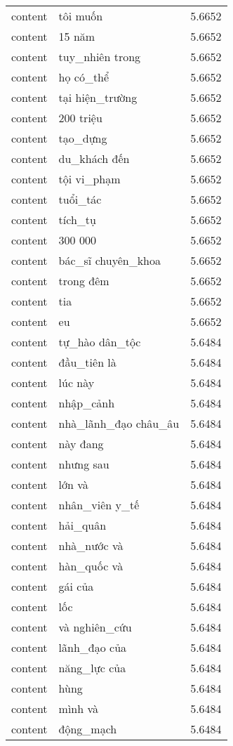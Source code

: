 \documentclass{article}
\begin{document}
\begin{tabular}{lll}
content & tôi muốn & 5.6652\\
content & 15 năm & 5.6652\\
content & tuy\_nhiên trong & 5.6652\\
content & họ có\_thể & 5.6652\\
content & tại hiện\_trường & 5.6652\\
content & 200 triệu & 5.6652\\
content & tạo\_dựng & 5.6652\\
content & du\_khách đến & 5.6652\\
content & tội vi\_phạm & 5.6652\\
content & tuổi\_tác & 5.6652\\
content & tích\_tụ & 5.6652\\
content & 300 000 & 5.6652\\
content & bác\_sĩ chuyên\_khoa & 5.6652\\
content & trong đêm & 5.6652\\
content & tia & 5.6652\\
content & eu & 5.6652\\
content & tự\_hào dân\_tộc & 5.6484\\
content & đầu\_tiên là & 5.6484\\
content & lúc này & 5.6484\\
content & nhập\_cảnh & 5.6484\\
content & nhà\_lãnh\_đạo châu\_âu & 5.6484\\
content & này đang & 5.6484\\
content & nhưng sau & 5.6484\\
content & lớn và & 5.6484\\
content & nhân\_viên y\_tế & 5.6484\\
content & hải\_quân & 5.6484\\
content & nhà\_nước và & 5.6484\\
content & hàn\_quốc và & 5.6484\\
content & gái của & 5.6484\\
content & lốc & 5.6484\\
content & và nghiên\_cứu & 5.6484\\
content & lãnh\_đạo của & 5.6484\\
content & năng\_lực của & 5.6484\\
content & hùng & 5.6484\\
content & mình và & 5.6484\\
content & động\_mạch & 5.6484\\

\end{tabular}
\end{document}
